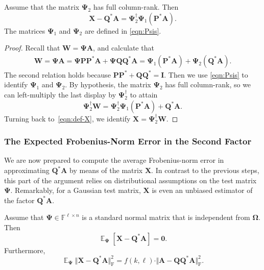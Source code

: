 \documentclass[final]{siamart1116}
\numberwithin{equation}{section}
\numberwithin{theorem}{section}
\numberwithin{figure}{section}
\newcommand{\F}{\mathbb{F}}
\newcommand{\mtx}[1]{\bm{#1}}
\newcommand{\Id}{\mathbf{I}}
\newcommand{\norm}[1]{\Vert #1 \Vert}
\newcommand{\fnorm}[1]{\norm{#1}_{\mathrm{F}}}
\newcommand{\fnormsq}[1]{\fnorm{#1}^2}
\newcommand{\Expect}{\operatorname{\mathbb{E}}}
\begin{document}
\begin{lemma} \label{lem:subspace-err}
Assume that the matrix $\mtx{\Psi}_2$ has full column-rank.  Then
\begin{equation} \label{eqn:B-Q*A}
\mtx{X} - \mtx{Q}^* \mtx{A} = \mtx{\Psi}_2^\dagger \mtx{\Psi}_1 (\mtx{P}^*\mtx{A}) .
\end{equation}
The matrices $\mtx{\Psi}_1$ and $\mtx{\Psi}_2$ are defined in \cref{eqn:Psis}.
\end{lemma}

\begin{proof}
Recall that $\mtx{W} = \mtx{\Psi} \mtx{A}$, and calculate that
$$
\begin{aligned}
\mtx{W} = \mtx{\Psi} \mtx{A}
	= \mtx{\Psi}\mtx{PP}^* \mtx{A} + \mtx{\Psi} \mtx{QQ}^* \mtx{A}
	= \mtx{\Psi}_1 (\mtx{P}^*\mtx{A}) + \mtx{\Psi}_2 (\mtx{Q}^* \mtx{A}).
\end{aligned}
$$
The second relation holds because $\mtx{PP}^* + \mtx{QQ}^* = \Id$.
Then we use \cref{eqn:Psis} to identify $\mtx{\Psi}_1$ and $\mtx{\Psi}_2$.
By hypothesis, the matrix  $\mtx{\Psi}_2$ has full column-rank,
so we can left-multiply the last display by $\mtx{\Psi}_2^\dagger$ to attain
$$
\mtx{\Psi}_2^\dagger \mtx{W} = \mtx{\Psi}_2^\dagger \mtx{\Psi}_1 (\mtx{P}^* \mtx{A}) + \mtx{Q}^* \mtx{A}.
$$
Turning back to~\cref{eqn:def-X},
we identify $\mtx{X} = \mtx{\Psi}_2^\dagger \mtx{W}$.
\end{proof}

\subsubsection{The Expected Frobenius-Norm Error in the Second Factor}

We are now prepared to compute the average Frobenius-norm error in approximating
$\mtx{Q}^*\mtx{A}$ by means of the matrix $\mtx{X}$.  In contrast
to the previous steps, this part of the argument relies on
distributional assumptions on the test matrix $\mtx{\Psi}$.
Remarkably, for a Gaussian test matrix, $\mtx{X}$
is even an unbiased estimator
of the factor $\mtx{Q}^*\mtx{A}.$

\begin{lemma} \label{lem:avg-subspace-err}
Assume that $\mtx{\Psi} \in \F^{\ell \times n}$
is a standard normal matrix that is independent from $\mtx{\Omega}$.
Then
$$
\Expect_{\mtx{\Psi}}[  \mtx{X} - \mtx{Q}^* \mtx{A} ] = \mtx{0}.
$$
Furthermore,
$$
\Expect_{\mtx{\Psi}} \fnormsq{ \mtx{X}  - \mtx{Q}^* \mtx{A} }
	= f(k,\ell) \cdot \fnormsq{ \mtx{A} - \mtx{QQ}^* \mtx{A} }.
$$
\end{lemma}
\end{document}
